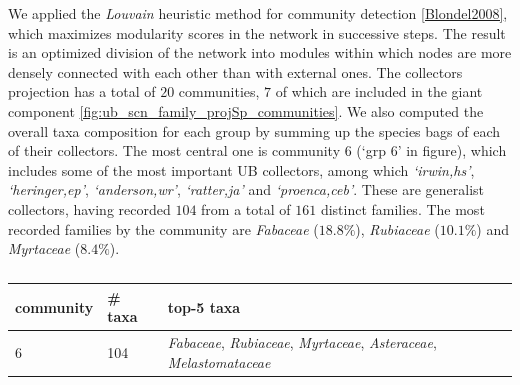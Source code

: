 We applied the \textit{Louvain} heuristic method for community detection \ref{Blondel2008}, which maximizes modularity scores in the network in successive steps.   
The result is an optimized division of the network into modules within which nodes are more densely connected with each other than with external ones.
%
The collectors projection has a total of $20$ communities, $7$ of which are included in the giant component \ref{fig:ub_scn_family_projSp_communities}.
We also computed the overall taxa composition for each group by summing up the species bags of each of their collectors.
%
The most central one is community $6$ (`grp $6$' in figure), which includes some of the most important UB collectors, among which \textit{`irwin,hs'}, \textit{`heringer,ep'}, \textit{`anderson,wr'}, \textit{`ratter,ja'} and \textit{`proenca,ceb'}.
These are generalist collectors, having recorded $104$ from a total of $161$ distinct families. 
The most recorded families by the community are \textit{Fabaceae} ($18.8\%$), \textit{Rubiaceae} ($10.1\%$) and \textit{Myrtaceae} ($8.4\%$). 
%

\begin{table}[H]
  \caption{}
  \begin{center}
  \begin{tabular}{l l l}
      community & # taxa & top-5 taxa\\
      \hline
      6 & 104 & \textit{Fabaceae}, \textit{Rubiaceae}, \textit{Myrtaceae}, \textit{Asteraceae}, \textit{Melastomataceae} \\
      \hline
  \end{tabular}
  \end{center}
\end{table}







